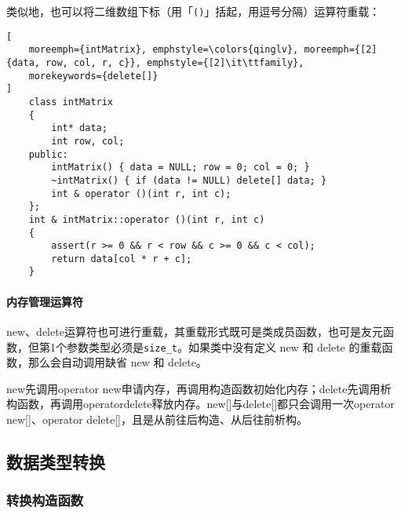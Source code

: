 \documentclass[10pt, a4paper, oneside, fontset=none]{ctexart}
\theoremstyle{plain}
\theoremstyle{definition}
\newcommand{\colors}[1]{\color{#1!75!black}}
\begin{document}
类似地，也可以将二维数组下标（用「\texttt{()}」括起，用逗号分隔）运算符重载：
\begin{lstlisting}[
	moreemph={intMatrix}, emphstyle=\colors{qinglv}, moreemph={[2]{data, row, col, r, c}}, emphstyle={[2]\it\ttfamily},
	morekeywords={delete[]}
]
	class intMatrix
	{
		int* data;
		int row, col;
	public:
		intMatrix() { data = NULL; row = 0; col = 0; }
		~intMatrix() { if (data != NULL) delete[] data; }
		int & operator ()(int r, int c);
	};
	int & intMatrix::operator ()(int r, int c)
	{
		assert(r >= 0 && r < row && c >= 0 && c < col);
		return data[col * r + c];
	}
\end{lstlisting}

\paragraph{内存管理运算符}

new、delete运算符也可进行重载，其重载形式既可是类成员函数，也可是友元函数，但第1个参数类型必须是\texttt{size\_t}。如果类中没有定义 new 和 delete 的重载函数，那么会自动调用缺省 new 和 delete。

new先调用operator new申请内存，再调用构造函数初始化内存；delete先调用析构函数，再调用operatordelete释放内存。new[]与delete[]都只会调用一次operator new[]、operator delete[]，且是从前往后构造、从后往前析构。

\subsection{数据类型转换}

\subsubsection{转换构造函数}
\end{document}
